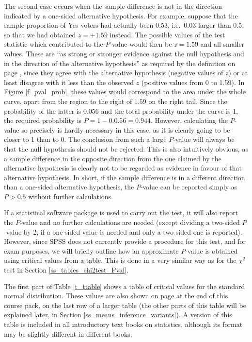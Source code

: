 The second case occurs when the sample difference is not in the
direction indicated by a one-sided alternative hypothesis. For example,
suppose that the sample proportion of Yes-voters had actually been 0.53,
i.e.\ 0.03 larger than 0.5, so that we had obtained $z=+1.59$ instead.
The possible values of the test statistic which contributed to the
$P$-value would then be $z=1.59$ and all smaller values. These are ``as
strong or stronger evidence against the null hypothesis and in the
direction of the alternative hypothesis'' as required by the definition
on page \pageref{p_pval_ref}, since they agree with the alternative
hypothesis (negative values of $z$) or at least disagree with it less
than the observed $z$ (positive values from 0 to 1.59). In Figure
\ref{f_pval_prob}, these values would correspond to the area under the
whole curve, apart from the region to the right of $1.59$ on the right
tail. Since the probability of the latter is 0.056 and the total
probability under the curve is 1, the required probability is
$P=1-0.0.56=0.944$. However, calculating the $P$-value so precisely is
hardly necessary in this case, as it is clearly going to be closer to 1
than to 0. The conclusion from such a large $P$-value will always be
that the null hypothesis should not be rejected. This is also
intuitively obvious, as a sample difference in the opposite direction
from the one claimed by the alternative hypothesis is clearly not to be
regarded as evidence in favour of that alternative hypothesis. In short,
if the sample difference is in a different direction than a one-sided
alternative hypothesis, the $P$-value can be reported simply as $P>0.5$
without further calculations.

If a statistical software package is used to carry out the
test, it will
also report the $P$-value and no further calculations are needed (except
dividing a two-sided $P$-value by 2, if a one-sided value is
needed and only a two-sided one is reported). However, since SPSS does
not currently provide a procedure for this test, and for exam purposes,
we will briefly outline how an approximate $P$-value is obtained using
critical values from a table. This is done in a very similar way as for
the $\chi^{2}$ test in Section \ref{ss_tables_chi2test_Pval}.

The first part of Table \ref{t_ttable} shows a table of critical values
for the standard normal distribution. These
values are also shown on page \pageref{s_disttables_t} at the end of
this course pack, on the last row of a larger table (the other parts of
this table will be explained later, in Section
\ref{ss_means_inference_variants}). A version of this
table is included in all introductory text books on statistics, although
its format may be slightly different in different books.

